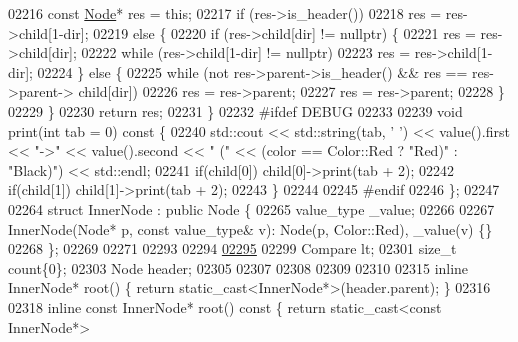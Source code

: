 \begin{DoxyCode}
02216             \textcolor{keyword}{const} \hyperlink{structaed2_1_1map_1_1Node_a9c1a600491066ce7eb669b1cb76d56c6_a9c1a600491066ce7eb669b1cb76d56c6}{Node}* res = \textcolor{keyword}{this};
02217             \textcolor{keywordflow}{if} (res->is\_header())
02218                 res = res->child[1-dir];
02219             \textcolor{keywordflow}{else} \{
02220                 if (res->child[dir] != \textcolor{keyword}{nullptr}) \{
02221                     res = res->child[dir];
02222                     \textcolor{keywordflow}{while} (res->child[1-dir] != \textcolor{keyword}{nullptr})
02223                         res = res->child[1-dir];
02224                 \} \textcolor{keywordflow}{else} \{
02225                     \textcolor{keywordflow}{while} (not res->parent->is\_header() && res == res->parent->
      child[dir])
02226                         res = res->parent;
02227                     res = res->parent;
02228                 \}
02229             \}
02230             \textcolor{keywordflow}{return} res;
02231         \}
02232 \textcolor{preprocessor}{#ifdef DEBUG}
02233 \textcolor{preprocessor}{}
02239         \textcolor{keywordtype}{void} print(\textcolor{keywordtype}{int} tab = 0)\textcolor{keyword}{ const }\{
02240             std::cout << std::string(tab, \textcolor{charliteral}{' '}) << value().first << \textcolor{stringliteral}{"->"} << 
      value().second << \textcolor{stringliteral}{"   ("} << (color == Color::Red ? \textcolor{stringliteral}{"Red)"} : \textcolor{stringliteral}{"Black)"}) << std::endl;
02241             \textcolor{keywordflow}{if}(child[0]) child[0]->print(tab + 2);
02242             \textcolor{keywordflow}{if}(child[1]) child[1]->print(tab + 2);
02243         \}
02244 
02245 \textcolor{preprocessor}{#endif}
02246 \textcolor{preprocessor}{}    \};
02247 
02264     \textcolor{keyword}{struct }InnerNode : \textcolor{keyword}{public} Node \{
02265         value\_type \_value;
02266 
02267         InnerNode(Node* p, \textcolor{keyword}{const} value\_type& v): Node(p, Color::Red), \_value(v)
       \{\}
02268     \};
02269 
02271 
02293 
02294 
\hypertarget{map_8h_source_l02295}{}\hyperlink{classaed2_1_1map_a0e5be36fae0693e4665bd2a615e7550a_a0e5be36fae0693e4665bd2a615e7550a}{02295} 
02299     Compare lt;
02301     \textcolor{keywordtype}{size\_t} count\{0\};
02303     Node header;
02305 
02307 
02308 
02309 
02310 
02315     \textcolor{keyword}{inline} InnerNode* root() \{ \textcolor{keywordflow}{return} \textcolor{keyword}{static\_cast<}InnerNode*\textcolor{keyword}{>}(header.parent); \}
02316 
02318     \textcolor{keyword}{inline} \textcolor{keyword}{const} InnerNode* root()\textcolor{keyword}{ const }\{ \textcolor{keywordflow}{return} \textcolor{keyword}{static\_cast<}\textcolor{keyword}{const }InnerNode*\textcolor{keyword}{>}

\end{DoxyCode}

